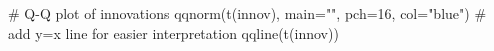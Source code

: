 \begin{Schunk}
\begin{Sinput}
 # Q-Q plot of innovations
 qqnorm(t(innov), main="", pch=16, col="blue")
 # add y=x line for easier interpretation
 qqline(t(innov))
\end{Sinput}
\end{Schunk}
